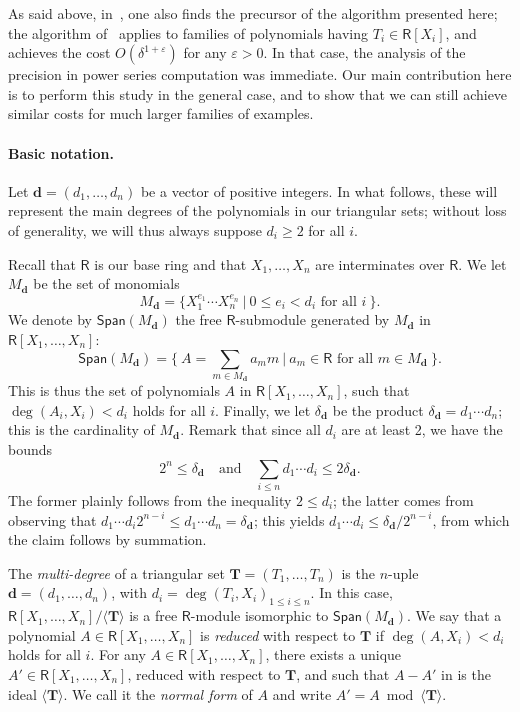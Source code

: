\documentclass[amsthm]{elsart}
\def\d {\ensuremath{\mathbf{d}}}
\def\T {\ensuremath{\mathbf{T}}}
\def\rng {\ensuremath{\mathsf{R}}}
\def\Span {\ensuremath{\mathsf{Span}}}
\theoremstyle{plain}
\begin{document}
As said above, in~\cite{LiMoSc07}, one also finds the precursor of the
algorithm presented here; the algorithm of~\cite{LiMoSc07} applies to
families of polynomials having $T_i \in \rng[X_i]$, and achieves the
cost $O(\delta^{1+\varepsilon})$ for any $\varepsilon > 0$. In that
case, the analysis of the precision in power series computation was
immediate. Our main contribution here is to perform this study in the
general case, and to show that we can still achieve similar costs for
much larger families of examples.

\paragraph*{Basic notation.}
Let $\d=(d_1,\dots,d_n)$ be a vector of positive integers. In what
follows, these will represent the main degrees of the polynomials in
our triangular sets; without loss of generality, we will thus always
suppose $d_i \ge 2$ for all $i$. 

Recall that $\rng$ is our base ring and that $X_1,\dots,X_n$ are
interminates over $\rng$. We let $M_\d$ be the set of monomials
$$M_\d= \big \{ X_1^{e_1}\cdots X_n^{e_n} \ | \ 0 \leq e_i < d_i
\text{~for~all~} i\ \big \}.$$ We
denote by $\Span(M_\d)$ the free $\rng$-submodule generated by $M_\d$
in $\rng[X_1,\dots,X_n]$:
$$\Span(M_\d) = \big \{\ A=\sum_{m \in M_\d} a_m m \ | \ a_m \in \rng \text{~for all $m \in M_\d$}\ \big
 \}.$$
This is thus the set of polynomials $A$ in $\rng[X_1,\dots,X_n]$, 
such that $\deg(A_i,X_i) < d_i$ holds for all $i$.
Finally, we let $\delta_\d$ be the product $\delta_\d=d_1\cdots d_n$;
this is the cardinality of $M_\d$. Remark that since all $d_i$ are at
least 2, we have the bounds
$$2^n \le \delta_\d \quad\text{and}\quad\sum_{i \le n} d_1\cdots d_i \le 2
\delta_\d.$$ The former plainly follows from the inequality $2 \le
d_i$; the latter comes from observing that $d_1\cdots d_i 2^{n-i} \le
d_1\cdots d_n = \delta_\d$; this yields $d_1\cdots d_i \le \delta_\d /
2^{n-i}$, from which the claim follows by summation.

The {\em multi-degree} of a triangular set $\T=(T_1,\dots,T_n)$ is the
$n$-uple $\d=(d_1,\dots,d_n)$, with $d_i=\deg(T_i,X_i)_{1 \leq i\leq
  n}$. In this case, $\rng[X_1,\dots,X_n]/\langle \T \rangle$ is a
free $\rng$-module isomorphic to $\Span(M_\d)$.  We say that a
polynomial $A \in \rng[X_1,\dots,X_n]$ is {\em reduced} with respect
to $\T$ if $\deg(A,X_i) < d_i$ holds for all $i$. For any $A \in
\rng[X_1,\dots,X_n]$, there exists a unique $A' \in
\rng[X_1,\dots,X_n]$, reduced with respect to $\T$, and such that
$A-A'$ in is the ideal $\langle \T\rangle$. We call it the {\em normal
  form} of $A$ and write $A' = A \bmod \langle \T \rangle$.
\end{document}
